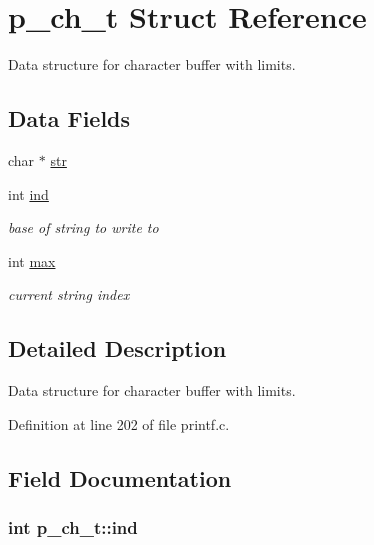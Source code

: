 \hypertarget{structp__ch__t}{}\section{p\+\_\+ch\+\_\+t Struct Reference}
\label{structp__ch__t}


Data structure for character buffer with limits.  


\subsection*{Data Fields}
\begin{DoxyCompactItemize}
\item 
char $\ast$ \hyperlink{structp__ch__t_aa3c8616342a2717bc714bf1b6d00516f}{str}
\item 
int \hyperlink{structp__ch__t_a9d6834d749cd9232a16cb20b598fe90d}{ind}
\begin{DoxyCompactList}\small\item\em base of string to write to \end{DoxyCompactList}\item 
int \hyperlink{structp__ch__t_a0dee9f28e498d427e53051b7e1846d34}{max}
\begin{DoxyCompactList}\small\item\em current string index \end{DoxyCompactList}\end{DoxyCompactItemize}


\subsection{Detailed Description}
Data structure for character buffer with limits. 

Definition at line 202 of file printf.\+c.



\subsection{Field Documentation}
\subsubsection[{\texorpdfstring{ind}{ind}}]{\setlength{\rightskip}{0pt plus 5cm}int p\+\_\+ch\+\_\+t\+::ind}\hypertarget{structp__ch__t_a9d6834d749cd9232a16cb20b598fe90d}{}\label{structp__ch__t_a9d6834d749cd9232a16cb20b598fe90d}


